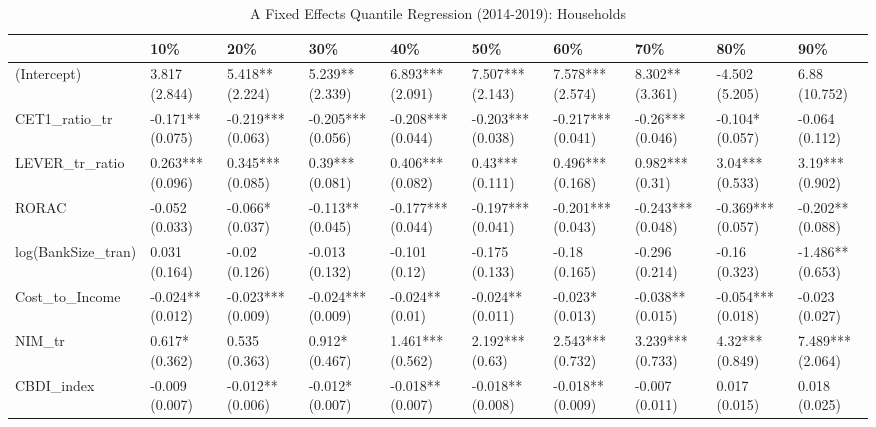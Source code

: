 \begin{table}[ht]
\centering
\caption{A Fixed Effects Quantile Regression (2014-2019): Households} 
\begingroup\small
\begin{tabular}{llllllllll}
  \toprule
 & 10\% & 20\% & 30\% & 40\% & 50\% & 60\% & 70\% & 80\% & 90\% \\ 
  \midrule
(Intercept) & 3.817 (2.844) & 5.418** (2.224) & 5.239** (2.339) & 6.893*** (2.091) & 7.507*** (2.143) & 7.578*** (2.574) & 8.302** (3.361) & -4.502 (5.205) & 6.88 (10.752) \\ 
  CET1\_ratio\_tr & -0.171** (0.075) & -0.219*** (0.063) & -0.205*** (0.056) & -0.208*** (0.044) & -0.203*** (0.038) & -0.217*** (0.041) & -0.26*** (0.046) & -0.104* (0.057) & -0.064 (0.112) \\ 
  LEVER\_tr\_ratio & 0.263*** (0.096) & 0.345*** (0.085) & 0.39*** (0.081) & 0.406*** (0.082) & 0.43*** (0.111) & 0.496*** (0.168) & 0.982*** (0.31) & 3.04*** (0.533) & 3.19*** (0.902) \\ 
  RORAC & -0.052 (0.033) & -0.066* (0.037) & -0.113** (0.045) & -0.177*** (0.044) & -0.197*** (0.041) & -0.201*** (0.043) & -0.243*** (0.048) & -0.369*** (0.057) & -0.202** (0.088) \\ 
  log(BankSize\_tran) & 0.031 (0.164) & -0.02 (0.126) & -0.013 (0.132) & -0.101 (0.12) & -0.175 (0.133) & -0.18 (0.165) & -0.296 (0.214) & -0.16 (0.323) & -1.486** (0.653) \\ 
  Cost\_to\_Income & -0.024** (0.012) & -0.023*** (0.009) & -0.024*** (0.009) & -0.024** (0.01) & -0.024** (0.011) & -0.023* (0.013) & -0.038** (0.015) & -0.054*** (0.018) & -0.023 (0.027) \\ 
  NIM\_tr & 0.617* (0.362) & 0.535 (0.363) & 0.912* (0.467) & 1.461*** (0.562) & 2.192*** (0.63) & 2.543*** (0.732) & 3.239*** (0.733) & 4.32*** (0.849) & 7.489*** (2.064) \\ 
  CBDI\_index & -0.009 (0.007) & -0.012** (0.006) & -0.012* (0.007) & -0.018** (0.007) & -0.018** (0.008) & -0.018** (0.009) & -0.007 (0.011) & 0.017 (0.015) & 0.018 (0.025) \\ 
   \bottomrule
\end{tabular}
\endgroup
\end{table}
